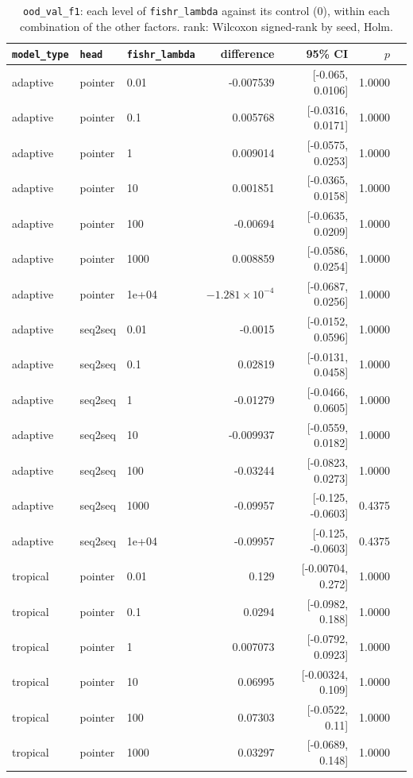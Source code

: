 \documentclass[10pt]{article}
\begin{document}
{\small
\begin{longtable}{lllrrrl}
\caption{\texttt{ood\_val\_f1}: each level of \texttt{fishr\_lambda} against its control (0), within each combination of the other factors. rank: Wilcoxon signed-rank by seed, Holm.}\label{tab:control-ood_val_f1}\\
\toprule
\texttt{model\_type} & \texttt{head} & \texttt{fishr\_lambda} & difference & 95\% CI & $p$ & \\
\midrule
\endhead
adaptive & pointer & 0.01 & -0.007539 & [-0.065, 0.0106] & 1.0000 & \\
adaptive & pointer & 0.1 & 0.005768 & [-0.0316, 0.0171] & 1.0000 & \\
adaptive & pointer & 1 & 0.009014 & [-0.0575, 0.0253] & 1.0000 & \\
adaptive & pointer & 10 & 0.001851 & [-0.0365, 0.0158] & 1.0000 & \\
adaptive & pointer & 100 & -0.00694 & [-0.0635, 0.0209] & 1.0000 & \\
adaptive & pointer & 1000 & 0.008859 & [-0.0586, 0.0254] & 1.0000 & \\
adaptive & pointer & 1e+04 & $-1.281\times10^{-4}$ & [-0.0687, 0.0256] & 1.0000 & \\
adaptive & seq2seq & 0.01 & -0.0015 & [-0.0152, 0.0596] & 1.0000 & \\
adaptive & seq2seq & 0.1 & 0.02819 & [-0.0131, 0.0458] & 1.0000 & \\
adaptive & seq2seq & 1 & -0.01279 & [-0.0466, 0.0605] & 1.0000 & \\
adaptive & seq2seq & 10 & -0.009937 & [-0.0559, 0.0182] & 1.0000 & \\
adaptive & seq2seq & 100 & -0.03244 & [-0.0823, 0.0273] & 1.0000 & \\
adaptive & seq2seq & 1000 & -0.09957 & [-0.125, -0.0603] & 0.4375 & \\
adaptive & seq2seq & 1e+04 & -0.09957 & [-0.125, -0.0603] & 0.4375 & \\
tropical & pointer & 0.01 & 0.129 & [-0.00704, 0.272] & 1.0000 & \\
tropical & pointer & 0.1 & 0.0294 & [-0.0982, 0.188] & 1.0000 & \\
tropical & pointer & 1 & 0.007073 & [-0.0792, 0.0923] & 1.0000 & \\
tropical & pointer & 10 & 0.06995 & [-0.00324, 0.109] & 1.0000 & \\
tropical & pointer & 100 & 0.07303 & [-0.0522, 0.11] & 1.0000 & \\
tropical & pointer & 1000 & 0.03297 & [-0.0689, 0.148] & 1.0000 & \\

\end{longtable}}
\end{document}
